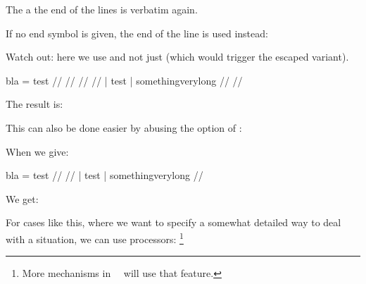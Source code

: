 \typebuffer[example][option=TEX]

The  a the end of the lines is verbatim again.

\starttextbackground[example]
    \getbuffer[example]
\stoptextbackground

If no end symbol is given, the end of the line is used instead:

\startbuffer[setup]
\setuptyping
  [annotatedtyping]
  [escape={//,},
   color=darkblue]
\stopbuffer

\typebuffer[setup][option=TEX] \getbuffer[setup]

Watch out: here we use \type {{//,}} and not just \type {//} (which would trigger
the escaped variant).


\startbuffer[example]
\startannotatedtyping
bla = test               // \black // 
                         // \black // 
    | test
    | somethingverylong  // \black // 
\stopannotatedtyping
\stopbuffer

\typebuffer[example][option=TEX]

The result is:

\starttextbackground[example]
    \getbuffer[example]
\stoptextbackground

This can also be done easier by abusing the  option of :

\startbuffer[setup]
\stopbuffer

\typebuffer[setup][option=TEX] \getbuffer[setup]

When we give:

\startbuffer[example]
\startannotatedtyping
bla = test               // 
                         // 
    | test
    | somethingverylong  // 
\stopannotatedtyping
\stopbuffer

\typebuffer[example][option=TEX]

We get:

\starttextbackground[example]
    \getbuffer[example]
\stoptextbackground

For cases like this, where we want to specify a somewhat detailed way to deal
with a situation, we can use processors: \footnote {More mechanisms in \CONTEXT\
\MKIV\ will use that feature.}

\startbuffer[setup]
\stopbuffer

